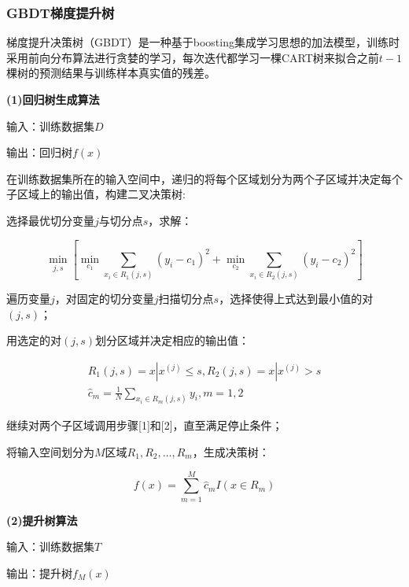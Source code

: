 \documentclass[UTF8]{ctexart}
\begin{document}
\subsubsection{GBDT梯度提升树}
梯度提升决策树（GBDT）是一种基于boosting集成学习思想的加法模型，训练时采用前向分布算法进行贪婪的学习，每次迭代都学习一棵CART树来拟合之前$t-1$棵树的预测结果与训练样本真实值的残差。  \par
\textbf{(1)回归树生成算法 }\par
输入：训练数据集$D$   \par
输出：回归树$f\left( x \right) $     \par
在训练数据集所在的输入空间中，递归的将每个区域划分为两个子区域并决定每个子区域上的输出值，构建二叉决策树:  \par
[1]选择最优切分变量$j$与切分点$s$，求解： \par
\begin{equation}
\min_{j,s} \left[ \min_{c_1} \sum_{x_i\in R_1\left( j,s \right)}{\left( y_i-c_1 \right) ^2}+\underset{c_2}{\min}\sum_{x_i\in R_2\left( j,s \right)}{\left( y_i-c_2 \right) ^2} \right] 
\end{equation}\par
遍历变量$j$，对固定的切分变量$j$扫描切分点$s$，选择使得上式达到最小值的对$\left( j,s \right) $；\par
[2]用选定的对$\left( j,s \right) $划分区域并决定相应的输出值： \par
	\begin{equation}
	\begin{aligned}
	R_1\left( j,s \right) =x\left| x^{\left( j \right)} \right. \leq s,R_2\left( j,s \right) =x\left| x^{\left( j \right)} \right. >s
	\\
	\hat{c}_m=\frac{1}{N}\sum_{x_i\in R_m\left( j,s \right)}{y_i},m=1,2
	\end{aligned}
\end{equation}\par
[3]继续对两个子区域调用步骤[1]和[2]，直至满足停止条件；\par
[4]将输入空间划分为$M$区域$R_1,R_2,…,R_m$，生成决策树： \par
	\begin{equation}
f\left( x \right) =\sum_{m=1}^M{\hat{c}_mI\left( x\in R_m \right)}
\end{equation}\par
\textbf{(2)提升树算法 }\par
输入：训练数据集$T$ \par
输出：提升树$f_M\left( x \right) $   \par
\end{document}

